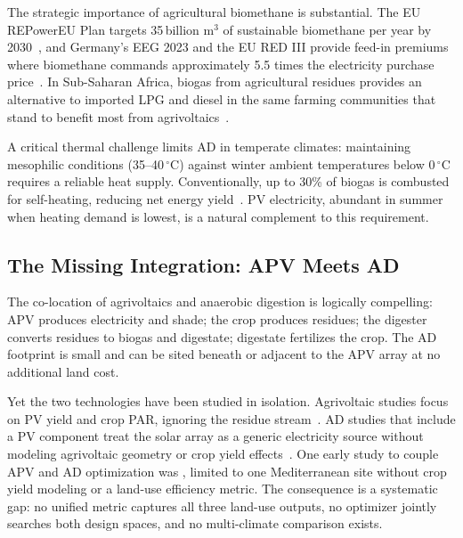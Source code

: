 The strategic importance of agricultural biomethane is substantial.
The EU REPowerEU Plan targets 35\,billion m$^3$ of sustainable biomethane
per year by 2030~\citep{ec2022}, and Germany's EEG 2023 and the EU RED III
provide feed-in premiums where biomethane commands approximately 5.5 times
the electricity purchase price~\citep{nikzad2026, eba2025, rabobank2025}.
In Sub-Saharan Africa, biogas from agricultural residues provides an
alternative to imported LPG and diesel in the same farming communities
that stand to benefit most from agrivoltaics~\citep{iea2025}.

A critical thermal challenge limits AD in temperate climates: maintaining
mesophilic conditions (35--40\,$^{\circ}$C) against winter ambient
temperatures below 0\,$^{\circ}$C requires a reliable heat supply.
Conventionally, up to 30\% of biogas is combusted for self-heating,
reducing net energy yield~\citep{lindorfer2008}. PV electricity, abundant
in summer when heating demand is lowest, is a natural complement to
this requirement.

\subsection{The Missing Integration: APV Meets AD}

\hspace{1cm}The co-location of agrivoltaics and anaerobic digestion is
logically compelling: APV produces electricity and shade; the crop produces
residues; the digester converts residues to biogas and digestate; digestate
fertilizes the crop. The AD footprint is small and can be sited beneath or
adjacent to the APV array at no additional land cost.

Yet the two technologies have been studied in isolation. Agrivoltaic studies
focus on PV yield and crop PAR, ignoring the residue
stream~\citep{riaz2022, zainali2023, mazzeo2025}. AD studies that include
a PV component treat the solar array as a generic electricity source without
modeling agrivoltaic geometry or crop yield
effects~\citep{pal2024, temiz2024}. One early study to couple APV and AD
optimization was \citet{nikzad2026}, limited to one Mediterranean site
without crop yield modeling or a land-use efficiency metric. The consequence
is a systematic gap: no unified metric captures all three land-use outputs,
no optimizer jointly searches both design spaces, and no multi-climate
comparison exists.

